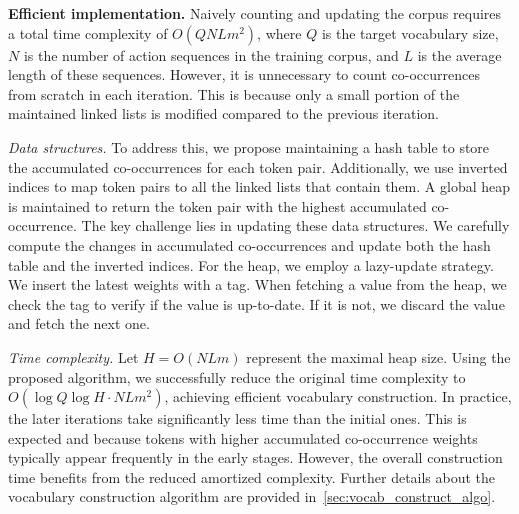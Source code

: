 



\textbf{Efficient implementation.} Naively counting and updating the corpus requires a total time complexity of $O(QNLm^2)$, where $Q$ is the target vocabulary size, $N$ is the number of action sequences in the training corpus, and $L$ is the average length of these sequences. However, it is unnecessary to count co-occurrences from scratch in each iteration. This is because only a small portion of the maintained linked lists is modified compared to the previous iteration.

\emph{Data structures.} To address this, we propose maintaining a hash table to store the accumulated co-occurrences for each token pair. Additionally, we use inverted indices to map token pairs to all the linked lists that contain them. A global heap is maintained to return the token pair with the highest accumulated co-occurrence. The key challenge lies in updating these data structures. We carefully compute the changes in accumulated co-occurrences and update both the hash table and the inverted indices. For the heap, we employ a lazy-update strategy. We insert the latest weights with a tag. When fetching a value from the heap, we check the tag to verify if the value is up-to-date. If it is not, we discard the value and fetch the next one.

\emph{Time complexity.} Let $H = O(NLm)$ represent the maximal heap size.
Using the proposed algorithm, we successfully reduce the original time complexity to $O(\log{Q}\log{H}\cdot NLm^2)$, achieving efficient vocabulary construction. In practice, the later iterations take significantly less time than the initial ones. This is expected and because tokens with higher accumulated co-occurrence weights typically appear frequently in the early stages. However, the overall construction time benefits from the reduced amortized complexity. Further details about the vocabulary construction algorithm are provided in~\cref{sec:vocab_construct_algo}.


